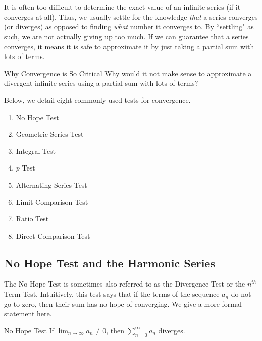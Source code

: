 \section{}\label{conv}

It is often too difficult to determine the exact value of an infinite series (if it converges at all).  Thus, we usually settle for the knowledge \emph{that} a series converges (or diverges) as opposed to finding \emph{what} number it converges to.  By ``settling" as such, we are not actually giving up too much.  If we can guarantee that a series converges, it means it is safe to approximate it by just taking a partial sum with lots of terms.  

\begin{exercise}{Why Convergence is So Critical \Coffeecup \Coffeecup}
Why would it not make sense to approximate a divergent infinite series using a partial sum with lots of terms?
\end{exercise}

Below, we detail eight commonly used tests for convergence.

\begin{enumerate}
\item No Hope Test
\item Geometric Series Test
\item Integral Test
\item $p$ Test
\item Alternating Series Test
\item Limit Comparison Test
\item Ratio Test
\item Direct Comparison Test
\end{enumerate}

\subsection{No Hope Test and the Harmonic Series}\label{TomaytoWithMayo}
The No Hope Test is sometimes also referred to as the Divergence Test or the $n^{th}$ Term Test.  Intuitively, this test says that if the terms of the sequence $a_n$ do not go to zero, then their sum has no hope of converging.  We give a more formal statement here.

\begin{theorem}{No Hope Test}
If $\lim_{n\rightarrow \infty} a_n \not = 0$, then $\sum_{n=0}^\infty a_n$ diverges.
\end{theorem}


